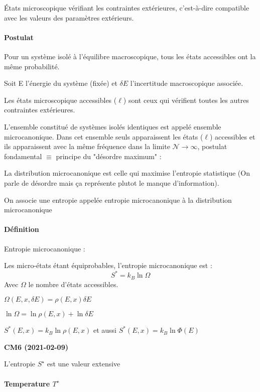 \documentclass[12pt,a4paper]{report}
\begin{document}
États microscopique vérifiant les contraintes extérieures, c'est-à-dire compatible avec les valeurs des paramètres extérieurs.

\paragraph{Postulat}

Pour un système isolé à l'équilibre macroscopique, tous les états accessibles ont la même probabilité.

Soit E l'énergie du système (fixée) et \(\delta E\) l'incertitude macroscopique associée.

Les états microscopique accessibles (\(\ell\)) sont ceux qui vérifient toutes les autres contraintes extérieures.

L'ensemble constitué de systèmes isolés identiques est appelé ensemble microcanonique. Dans cet ensemble seuls apparaissent les états (\(\ell\)) accessibles et ils apparaissent avec la même fréquence dans la limite \(\mathcal{N} \rightarrow \infty\), postulat fondamental \(\equiv\) principe du "désordre maximum" :

La distribution microcanonique est celle qui maximise l'entropie statistique (On parle de désordre mais ça représente plutot le manque d'information).

On associe une entropie appelée entropie microcanonique à la distribution microcanonique

\paragraph{Définition} Entropie microcanonique :

Les micro-états étant équiprobables, l'entropie microcanonique est :
\[
	S^* = k_B \ln \Omega
\]
Avec \(\Omega\) le nombre d'états accessibles.

\(\Omega(E,x, \delta	E )= \rho(E, x)\delta E \)

\(\ln \Omega = \ln \rho(E,x) + \ln \delta E\)

\(S^* (E,x) = k_B \ln \rho(E,x)\) et aussi \(S^* (E,x) = k_B \ln \Phi(E)\)

\begin{center}
\textbf{CM6 (2021-02-09)}
\end{center}

L'entropie \(S^\star\) est une valeur extensive

\paragraph{Temperature \(T^\star\)}
\end{document}
